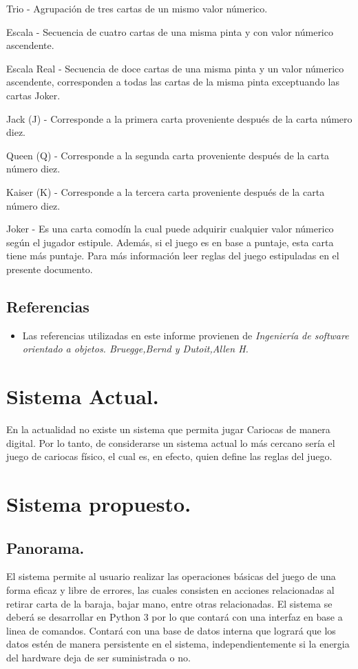 \documentclass[60pt]{article}
\begin{document}
Trio - Agrupación de tres cartas de un mismo valor númerico.

Escala - Secuencia de cuatro cartas de una misma pinta y con valor númerico ascendente.

Escala Real - Secuencia de doce cartas de una misma pinta y un valor númerico ascendente, corresponden a todas las cartas de la misma pinta exceptuando las cartas Joker.

Jack (J) - Corresponde a la primera carta proveniente después de la carta número diez.

Queen (Q) - Corresponde a la segunda carta proveniente después de la carta número diez.

Kaiser (K) - Corresponde a la tercera carta proveniente después de la carta número diez.

Joker - Es una carta comodín la cual puede adquirir cualquier valor númerico según el jugador estipule. Además, si el juego es en base a puntaje, esta carta tiene más puntaje. Para más información leer reglas del juego estipuladas en el presente documento.
\subsection{Referencias}
\begin{itemize}
    \item Las referencias utilizadas en este informe provienen de \textit{Ingeniería de software orientado a objetos. Bruegge,Bernd y Dutoit,Allen H.} \cite{oop}
\end{itemize}
\section{Sistema Actual.}\label{cap:sistemaActual}
En la actualidad no existe un sistema que permita jugar Cariocas de manera digital. Por lo tanto, de considerarse un sistema actual lo más cercano sería el juego de cariocas físico, el cual es, en efecto, quien define las reglas del juego.
\section{Sistema propuesto.}\label{cap:sistema}
\subsection{Panorama.}\label{cap:panorama}
El sistema permite al usuario realizar las operaciones básicas del juego de una forma eficaz y libre de errores, las cuales consisten en acciones relacionadas al retirar carta de la baraja, bajar mano, entre otras relacionadas. El sistema se deberá se desarrollar en Python 3 por lo que contará con una interfaz en base a linea de comandos. Contará con una base de datos interna que logrará que los datos estén de manera persistente en el sistema, independientemente si la energia del hardware deja de ser suministrada o no.
\end{document}

